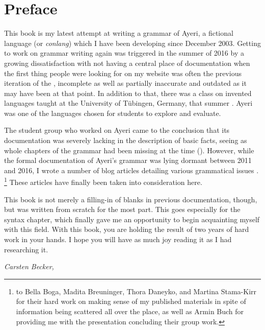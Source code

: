 \chapter{Preface}

This book is my latest attempt at writing a grammar of Ayeri, a fictional
language (or \emph{conlang}) which I have been developing since December
2003. Getting to work on grammar writing again was triggered in the summer of
2016 by a growing dissatisfaction with not having a central place of
documentation when the first thing people were looking for on my website was
often the previous iteration of the , incomplete as well as
partially inaccurate and outdated as it may have been at that point. In
addition to that, there was a class on invented languages taught at the
University of Tübingen, Germany, that summer \autocite{buch2016ss}. Ayeri was
one of the languages chosen for students to explore and evaluate.

The student group who worked on Ayeri came to the conclusion that its
documentation was severely lacking in the description of basic facts, seeing as
whole chapters of the grammar had been missing at the time
(\cite[12]{boga2016}). However, while the formal documentation of Ayeri's
grammar was lying dormant between 2011 and 2016, I wrote a number of blog
articles detailing various grammatical issues \autocite[Blog]{benung}.%
\footnote{ to Bella Boga, Madita
Breuninger, Thora Daneyko, and Martina Stama-Kirr for their hard work on making
sense of my published materials in spite of information being scattered all
over the place, as well as Armin Buch for providing me with the presentation
concluding their group work.} These articles have finally been taken into
consideration here.

This book is not merely a filling-in of blanks in previous documentation,
though, but was written from scratch for the most part. This goes especially
for the syntax chapter, which finally gave me an opportunity to begin
acquainting myself with this field. With this book, you are holding the result
of two years of hard work in your hands. I hope you will have as much joy
reading it as I had researching it.

\begin{flushright}\itshape\footnotesize
{}
Carsten Becker,  \the\year
\end{flushright}
